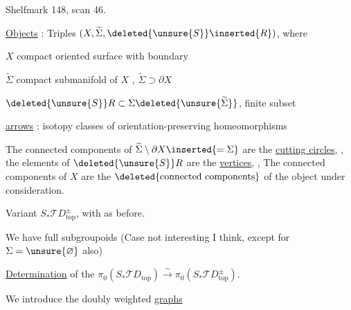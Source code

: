 Shelfmark 148, scan 46.

\uline{Objects} : Triples $(X,\widetilde\Sigma,
\deleted{\unsure{S}}\inserted{R})$, where

$X$ compact oriented surface with boundary

$\widetilde\Sigma$ compact submanifold of $X$
, $\widetilde\Sigma\supset\partial X$

$\deleted{\unsure{S}}R\subset\Sigma\deleted{\unsure{\widetilde\Sigma}}$,
finite subset


\uline{arrows} : isotopy classes of orientation-preserving homeomorphisms

The connected components of $\widetilde\Sigma\setminus\partial X
\inserted{=\Sigma}$ are the \uline{cutting circles},
,
the elements of $\deleted{\unsure{S}}R$ are the
 \uline{
vertices},
,
The connected components of $X$ are the
$\deleted{\text{connected components}}$
of the object under consideration.

Variant $S_*\mathcal TD_{\mathrm{top}}^\pm$, with
as before.

We have full subgroupoids
(Case not interesting I think, except for $\Sigma=\unsure{\varnothing}$
also)


 \uline{Determination} of the
$\pi_0(S_*\mathcal TD_{\mathrm{top}})
 \xrightarrow{\sim}\pi_0(S_*\mathcal TD^\pm_{\mathrm{top}})$.

We introduce the doubly weighted \uline{graphs} 
